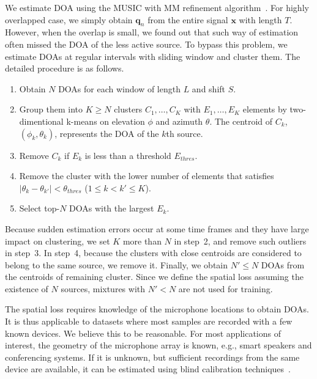 \documentclass[a4paper]{article}
\begin{document}
We estimate DOA using the MUSIC with MM refinement algorithm~\cite{doamm}.
For highly overlapped case, we simply obtain $\bm{q}_{n}$ from the entire signal $\bm{x}$ with length $T$.
However, when the overlap is small, we found out that such way of estimation often missed the DOA of the less active source.
To bypass this problem, we estimate DOAs at regular intervals with sliding window and cluster them.
The detailed procedure is as follows.
\begin{enumerate}
    \setlength{\itemsep}{2pt}
    \setlength{\parskip}{0pt}
    \setlength{\leftskip}{-10pt}
    \item Obtain $N$ DOAs for each window of length $L$ and shift $S$.
    \item Group them into $K \geq N$ clusters $C_1,\ldots,C_K$ with $E_1,\ldots,E_K$ elements by two-dimentional k-means on elevation $\phi$ and azimuth $\theta$. The centroid of $C_k$, $(\phi_{k}, \theta_{k})$, represents the DOA of the $k$th source.
    \item Remove $C_k$ if $E_k$ is less than a threshold $E_{thres}$.
    \item Remove the cluster with the lower number of elements that satisfies $|\theta_{k}-\theta_{k'}|<\theta_{thres}$ ($1 \leq k < k' \leq K$). 
    \item Select top-$N$ DOAs with the largest $E_k$.
\end{enumerate}
Because sudden estimation errors occur at some time frames and they have large impact on clustering, we set $K$ more than $N$ in step~2, and remove such outliers in step~3.
In step~4, because the clusters with close centroids are considered to belong to the same source, we remove it.
Finally, we obtain $N' \leq N$ DOAs from the centroids of remaining cluster.
Since we define the spatial loss assuming the existence of $N$ sources, mixtures with $N'<N$ are not used for training.

The spatial loss requires knowledge of the microphone locations to obtain DOAs.
It is thus applicable to datasets where most samples are recorded with a few known devices.
We believe this to be reasonable.
For most applications of interest, the geometry of the microphone array is known, e.g., smart speakers and conferencing systems.
If it is unknown, but sufficient recordings from the same device are available, it can be estimated using blind calibration techniques~\cite{thrun_calibration, krekovic_calibration}.
\end{document}
